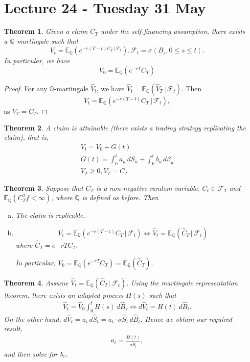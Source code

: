 \documentclass[10pt, oneside, reqno]{amsart}
\theoremstyle{plain}%
\newtheorem{thm}{Theorem}[section]
\theoremstyle{definition}
\theoremstyle{remark}
\newcommand{\given}{ \, | \,}
\newcommand{\Q}{\mathbb{Q}}
\newcommand{\E}{\mathbb{E}}
\newcommand{\sigf}{\mathcal{F}}
\begin{document}
\section{Lecture 24 - Tuesday 31 May} %
\label{sec:lecture_24_tuesday_31_may}
\begin{thm}
	Given a claim $C_T$ under the self-financing assumption, there exists a $\Q$-martingale such that \[
		V_t = \E_\Q\left( e^{-r(T-t) C_T \given \sigf_t} \right), \sigf_t = \sigma(B_s, 0 \leq s \leq t).
	\] In particular, we have \[
		V_0 = \E_\Q(e^{-rT}C_T)
	\]
\end{thm}

\begin{proof}
	For any $\Q$-martingale $\hat V_t$, we have $\hat V_t = \E_\Q(\hat V_T \given \sigf_t)$.  Then \[
		V_t = \E_\Q(e^{-r(T-t)}C_T \given \sigf_t),
	\] as $V_T = C_T$.  
\end{proof}

\begin{thm}
	A claim is attainable (there exists a trading strategy replicating the claim), that is, \begin{align*}
		V_t = V_0 + G(t) \\
		G(t) = \int_0^t a_u \, dS_u + \int_0^t b_u \, d\beta_u \\
		V_T \geq 0, V_T = C_T 
	\end{align*}
\end{thm}

\begin{thm}
	Suppose that $C_T$ is a non-negative random variable, $C_t \in \sigf_T$ and $\E_\Q(C_T^2f < \infty)$, where $\Q$ is defined as before.  Then \begin{enumerate}[(a)]
		\item The claim is replicable.
		\item \[
			V_t = \E_\Q\left( e^{-r(T-t)} C_T \given \sigf_t \right) \iff \hat V_t = \E_\Q(\hat C_T \given \sigf_t)
		\] where $\hat C_T = e{-rT} C_T$.
		
		In particular, $V_0 = \E_\Q(e^{-rT} C_T) = \E_\Q(\hat C_T)$.
	\end{enumerate}
\end{thm}

\begin{thm}
	Assume $\hat V_t = \E_\Q(\hat C_T \given \sigf_t)$.  Using the martingale representation theorem, there exists an adapted process $H(s)$ such that \begin{align*}
		\hat V_t = \hat V_0 \int_0^t H(s) \, d \hat B_s \iff d \hat V_t = H(t) \, d\hat B_t.
	\end{align*}  On the other hand, $d \hat V_t = a_t \, d\hat S_t = a_t \cdot \sigma \hat S_t \, d \hat B_t$.  Hence we obtain our required result, \begin{align*}
		a_t = \frac{H(t)}{\sigma \hat S_t},
	\end{align*} and then solve for $b_t$.
\end{thm}
\end{document}
